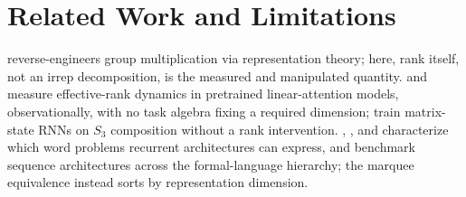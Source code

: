 \section{Related Work and Limitations}
\label{sec:related}

\citet{chughtai2023universality} reverse-engineers group multiplication
via representation theory; here, rank itself, not an irrep decomposition,
is the measured and manipulated quantity.
\citet{nazari2026rank} and \citet{sun2026staterank} measure
effective-rank dynamics in pretrained linear-attention models,
observationally, with no task algebra fixing a required dimension;
\citet{mishra2026m2rnn} train matrix-state RNNs on $S_3$ composition
without a rank intervention. \citet{grazzi2025negative},
\citet{siems2025deltaproduct}, and \citet{merrill2024illusion}
characterize which word problems recurrent architectures can express,
and \citet{deletang2023chomsky} benchmark sequence architectures across
the formal-language hierarchy; the marquee equivalence instead sorts by
representation dimension.
